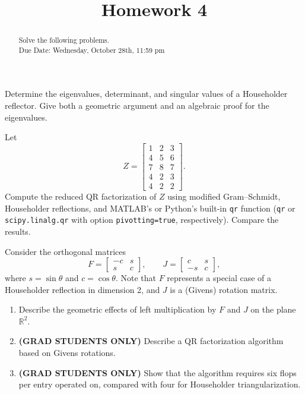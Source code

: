 \documentclass{ximera}
\begin{document}
    \title{Homework 4}
    
    \begin{abstract} Solve the following problems.
    \\
    Due Date: Wednesday, October 28th, 11:59 pm
    \end{abstract}
    \maketitle

\begin{exercise}
[10.1] Determine the eigenvalues, determinant, and singular values
of a Householder reflector. Give both a geometric argument and
an algebraic proof for the eigenvalues.
\end{exercise}

\begin{exercise}
[10.3] Let
\[
Z =
\begin{bmatrix}
1 & 2 & 3 \\
4 & 5 & 6 \\
7 & 8 & 7 \\
4 & 2 & 3 \\
4 & 2 & 2
\end{bmatrix}.
\]
Compute the reduced QR factorization of \(Z\) using modified
Gram--Schmidt, Householder reflections, and MATLAB's or Python's built-in
 \texttt{qr} function (\verb|qr| or \verb|scipy.linalg.qr| with option \verb|pivotting=true|, respectively). Compare the results.
\end{exercise}

\begin{exercise}
[10.4] Consider the orthogonal matrices
\[
F =
\begin{bmatrix}
-c & s \\
s & c
\end{bmatrix},
\qquad
J =
\begin{bmatrix}
c & s \\
-s & c
\end{bmatrix},
\]
where \(s=\sin\theta\) and \(c=\cos\theta\).  Note that $F$ represents a special case of a Householder reflection in dimension 2, and $J$ is a (Givens) rotation matrix.

\begin{enumerate}
    \item Describe the geometric effects of left multiplication
    by \(F\) and \(J\) on the plane $\mathbb{R}^2$.
    \item \textbf{(GRAD STUDENTS ONLY)} Describe a QR factorization algorithm based on Givens
    rotations.
    \item \textbf{(GRAD STUDENTS ONLY)} Show that the algorithm requires six flops per entry
    operated on, compared with four for Householder
    triangularization.
\end{enumerate}
\end{exercise}
\end{document}
